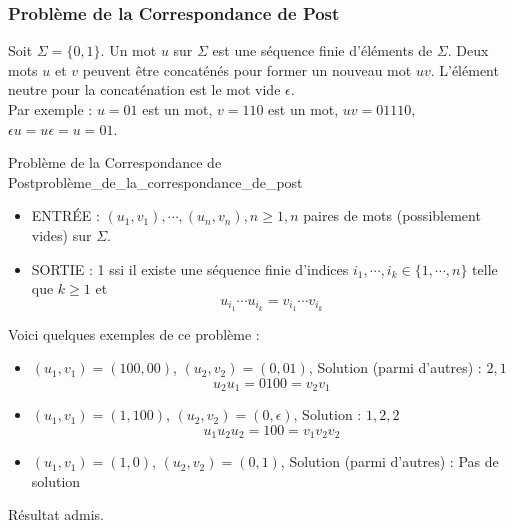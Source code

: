 \subsubsection{Problème de la Correspondance de Post}
\label{sub:probleme_de_la_correspondance_de_post}
Soit $\Sigma = \{0,1\}$. Un mot $u$ sur $\Sigma$ est une séquence finie d'éléments de $\Sigma$. Deux mots $u$ et $v$ peuvent
être concaténés pour former un nouveau mot $uv$. L'élément neutre pour la concaténation est le mot vide $\epsilon$.\\
Par exemple : $u=01$ est un mot, $v=110$ est un mot, $uv=01110$, $\epsilon u=u\epsilon=u=01$.
\begin{definition}{Problème de la Correspondance de Post}{problème_de_la_correspondance_de_post}
    \begin{itemize}[label=\textbullet]
        \item ENTRÉE : $(u_1,v_1),\cdots,(u_n,v_n),n\geq 1, n$ paires de mots (possiblement vides) sur $\Sigma$.
        \item SORTIE : 1 ssi il existe une séquence finie d'indices $i_1,\cdots,i_k\in\{1,\cdots,n\}$ telle que $k\geq 1$ et
        \begin{equation*}
            u_{i_1}\cdots u_{i_k} = v_{i_1}\cdots v_{i_k}
        \end{equation*}
    \end{itemize}
\end{definition}
\begin{example}
    Voici quelques exemples de ce problème :
    \begin{itemize}[label=\textbullet]
        \item $(u_1,v_1)=(100,00)$, $(u_2,v_2)=(0,01)$, Solution (parmi d'autres) : $2,1$
        \begin{equation*}
            u_2u_1 = 0100 = v_2v_1
        \end{equation*}
        \item $(u_1,v_1)=(1,100)$, $(u_2,v_2)=(0,\epsilon)$, Solution : $1,2,2$
        \begin{equation*}
            u_1u_2u_2 = 100 = v_1v_2v_2
        \end{equation*}
        \item $(u_1,v_1)=(1,0)$, $(u_2,v_2)=(0,1)$, Solution (parmi d'autres) : Pas de solution
    \end{itemize}
\end{example}
\begin{remark}
    Résultat admis.
\end{remark}


